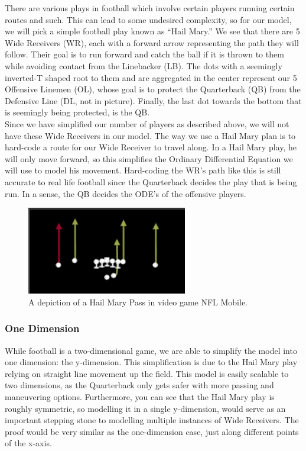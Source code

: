 \quad There are various plays in football which involve certain players running certain routes and such. This can lead to some undesired complexity, so for our model, we will pick a simple football play known as “Hail Mary.” We see that there are 5 Wide Receivers (WR), each with a forward arrow representing the path they will follow. Their goal is to run forward and catch the ball if it is thrown to them while avoiding contact from the Linebacker (LB). The dots with a seemingly inverted-T shaped root to them and are aggregated in the center represent our 5 Offensive Linemen (OL), whose goal is to protect the Quarterback (QB) from the Defensive Line (DL, not in picture). Finally, the last dot towards the bottom that is seemingly being protected, is the QB.\\

Since we have simplified our number of players as described above, we will not have these Wide Receivers in our model. The way we use a Hail Mary plan is to hard-code a route for our Wide Receiver to travel along. In a Hail Mary play, he will only move forward, so this simplifies the Ordinary Differential Equation we will use to model his movement. Hard-coding the WR's path like this is still accurate to real life football since the Quarterback decides the play that is being run. In a sense, the QB decides the ODE's of the offensive players. \\

\begin{figure}[htp]
    \centering
    \includegraphics[width=7cm]{figure/hailMary.png}
    \caption{A depiction of a Hail Mary Pass in video game NFL Mobile.}
\end{figure}

\subsubsection{One Dimension}

\quad While football is a two-dimensional game, we are able to simplify the model into one dimension: the y-dimension. This simplification is due to the Hail Mary play relying on straight line movement up the field. This model is easily scalable to two dimensions, as the Quarterback only gets safer with more passing and maneuvering options. Furthermore, you can see that the Hail Mary play is roughly symmetric, so modelling it in a single y-dimension, would serve as an important stepping stone to modelling multiple instances of Wide Receivers. The proof would be very similar as the one-dimension case, just along different points of the x-axis.

